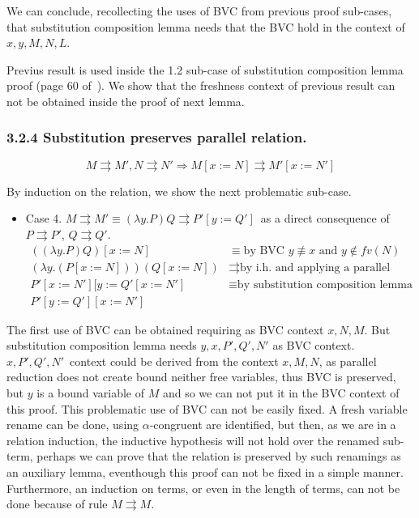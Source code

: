 \documentclass{article}
\newcommand{\alp}{\ensuremath{\alpha}}
\newcommand{\p}{\ensuremath{\rightrightarrows}}
\newcommand{\lam}{\ensuremath{\lambda}}
\begin{document}
We can conclude, recollecting the uses of BVC from previous proof sub-cases, that substitution composition lemma needs that the BVC hold in the context of $x,y,M,N,L$.

Previus result is used inside the 1.2 sub-case of substitution composition lemma proof (page 60 of~\cite{barendregt81}). We show that the freshness context of previous result can not be obtained inside the proof of next lemma.

\subsubsection*{3.2.4 Substitution preserves parallel relation.}

      \[ M \p M' , N \p N' \Rightarrow M [x:=N] \p M'[x:=N'] \]

By induction on the relation, we show the next problematic sub-case.

\begin{itemize}
\item{Case 4.} $M \p M' \equiv (\lam y. P)Q \p P'[y:=Q']$\ as a direct consequence of $P \p P'$, $Q \p Q'$.
  \[\begin{array}{ll}
      ((\lam y. P)Q) [x:=N] & \equiv \text{by BVC } y \not\equiv x \text{ and } y \not\in fv(N) \\
      (\lam y. (P [x:=N]))(Q [x:=N])  & \p \text{by i.h. and applying a parallel reduction step} \\
      P'[x:=N'][y := Q'[x:=N']  & \equiv \text{by substitution composition lemma 2.1.16} \\
      P'[y:=Q'][x:=N']
  \end{array}\]
\end{itemize}

The first use of BVC can be obtained requiring as BVC context $x,N,M$. But substitution composition lemma needs $y,x,P',Q',N'$ as BVC context. $x,P',Q',N'$\ context could be derived from the context $x,M,N$, as parallel reduction does not create bound neither free variables, thus BVC is preserved, but $y$ is a bound variable of $M$ and so we can not put it in the BVC context of this proof. This problematic use of BVC can not be easily fixed. A fresh variable rename can be done, using \alp-congruent are identified, but then, as we are in a relation induction, the inductive hypothesis will not hold over the renamed sub-term, perhaps we can prove that the relation is preserved by such renamings as an auxiliary lemma, eventhough  this proof can not be fixed in a simple manner. Furthermore, an induction on terms, or even in the length of terms, can not be done because of rule $M \p M$. 
\end{document}
